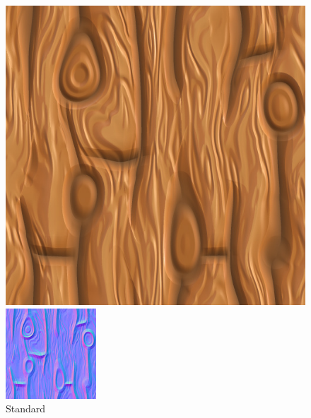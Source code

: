 \documentclass[a4paper, 11pt]{article}
\begin{document}
\begin{figure}[!h]
  \includegraphics[width=\linewidth]{sidelog.jpg}
  \caption{Standard}\label{fig:tex_img}
\endminipage\hfill
{}
  \includegraphics[width=\linewidth]{sidelognormal.jpg}

\end{figure}
\end{document}
